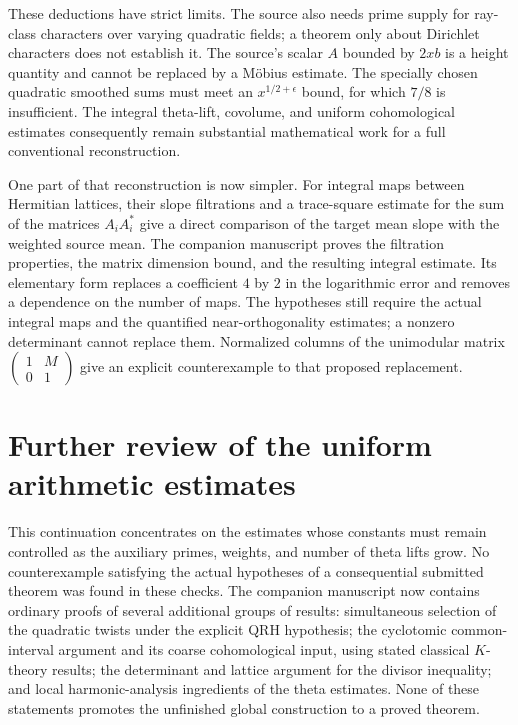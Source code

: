 \documentclass[11pt,a4paper]{article}
\theoremstyle{remark}
\begin{document}
These deductions have strict limits. The source also needs
prime supply for ray-class characters over varying quadratic
fields; a theorem only about Dirichlet characters does not
establish it. The source's scalar $A$ bounded by $2xb$ is a
height quantity and cannot be replaced by a M\"obius estimate.
The specially chosen quadratic smoothed sums must meet an
$x^{1/2+\epsilon}$ bound, for which $7/8$ is insufficient.
The integral theta-lift, covolume, and uniform cohomological
estimates consequently remain substantial mathematical work
for a full conventional reconstruction.

One part of that reconstruction is now simpler. For integral maps
between Hermitian lattices, their slope filtrations and a trace-square
estimate for the sum of the matrices $A_iA_i^*$ give a direct
comparison of the target mean slope with the weighted source mean.
The companion manuscript proves the filtration properties, the matrix
dimension bound, and the resulting integral estimate. Its elementary
form replaces a coefficient $4$ by $2$ in the logarithmic error and
removes a dependence on the number of maps. The hypotheses still
require the actual integral maps and the quantified near-orthogonality
estimates; a nonzero determinant cannot replace them. Normalized
columns of the unimodular matrix
$\left(\begin{smallmatrix}1&M\\0&1\end{smallmatrix}\right)$
give an explicit counterexample to that proposed replacement.


\section{Further review of the uniform arithmetic estimates}
\label{sec:audit-uniform-continuation}

This continuation concentrates on the estimates\cite{alpo-uniform-source} whose constants must
remain controlled as the auxiliary primes, weights, and number of theta
lifts grow. No counterexample satisfying the actual hypotheses of a
consequential submitted theorem was found in these checks. The companion
manuscript now contains ordinary proofs of several additional groups of
results: simultaneous selection of the quadratic twists under the
explicit QRH hypothesis; the cyclotomic common-interval argument
and its coarse cohomological input, using stated classical
$K$-theory results; the determinant and lattice
argument for the divisor inequality; and local harmonic-analysis
ingredients of the theta estimates. None of these statements promotes
the unfinished global construction to a proved theorem.
\end{document}
